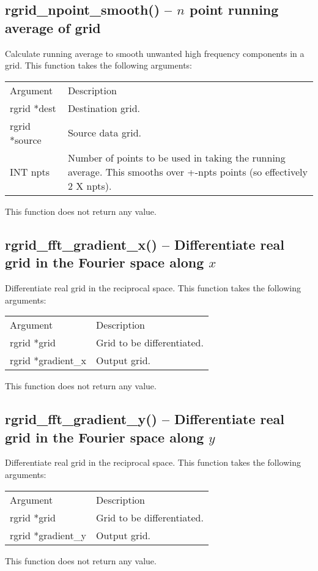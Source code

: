 \documentclass[12pt,letterpaper]{report}
\begin{document}
\subsection{rgrid\_npoint\_smooth() -- $n$ point running average of grid}

Calculate running average to smooth unwanted high frequency components in a grid. This function takes the following arguments:
\begin{longtable}{p{} p{}}
Argument & Description\\
\cline{1-2}
rgrid *dest & Destination grid.\\
rgrid *source & Source data grid.\\
INT npts & Number of points to be used in taking the running average. This smooths over +-npts points (so effectively 2 X npts).\\
\end{longtable}
\noindent
This function does not return any value.

\subsection{rgrid\_fft\_gradient\_x() -- Differentiate real grid in the Fourier space along $x$}

Differentiate real grid in the reciprocal space. This function takes the following arguments:
\begin{longtable}{p{} p{}}
Argument & Description\\
\cline{1-2}
rgrid *grid & Grid to be differentiated.\\
rgrid *gradient\_x & Output grid.\\
\end{longtable}
\noindent
This function does not return any value.

\subsection{rgrid\_fft\_gradient\_y() -- Differentiate real grid in the Fourier space along $y$}

Differentiate real grid in the reciprocal space. This function takes the following arguments:
\begin{longtable}{p{} p{}}
Argument & Description\\
\cline{1-2}
rgrid *grid & Grid to be differentiated.\\
rgrid *gradient\_y & Output grid.\\
\end{longtable}
\noindent
This function does not return any value.
\end{document}
